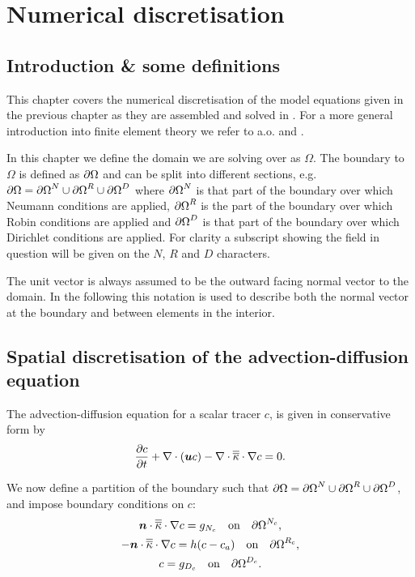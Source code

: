 \chapter{Numerical discretisation}\label{chap:numerical_discretisation}
\section{Introduction \& some definitions}\label{sec:ND_Intro}
This chapter covers the numerical discretisation of the model equations
given in the previous chapter as they are assembled and solved
in \fluidity. For a more general introduction into finite element theory
we refer to a.o. \cite{elman2005} and \cite{gresho1988}.

In this chapter we define the domain we are solving over as $\Omega$. The boundary to
$\Omega$ is defined as ${\partial\Omega}$
and can be split into different sections, e.g.
$\partial\Omega = {\partial\Omega}^{N}\cup {\partial\Omega}^{R}\cup {\partial\Omega}^{D}$
where ${\partial\Omega}^{N}$ is that part of the boundary over
which Neumann conditions are applied, ${\partial\Omega}^{R}$ is the part of the
boundary over which Robin conditions are applied and ${\partial\Omega}^{D}$ is that part of the boundary over
which Dirichlet conditions are applied. For clarity a subscript showing the field in question will
be given on the $N$, $R$ and $D$ characters.

The unit vector  is always assumed to be the
outward facing normal vector to the domain.
In the following this notation is used to describe both the normal vector at the boundary
and between elements in the interior.

\section{Spatial discretisation of the advection-diffusion equation}
\label{sec:ND_advection_diffusion_discretisation}

The advection-diffusion equation for a scalar tracer $c$,
is given in conservative form by
\begin{equation}\label{eq:advdif}
  \frac{\partial c}{\partial t} + \nabla\cdot\left({\mbox{\boldmath$u$}} c\right) - \nabla\cdot\overline{\overline{\kappa}}\cdot\nabla c = 0.
\end{equation}

We now define a partition of the boundary such that
$\partial\Omega = {\partial\Omega}^{N}\cup {\partial\Omega}^{R}\cup {\partial\Omega}^{D}$, and impose boundary conditions on $c$:
\begin{gather}
  \label{eq:cboundary}
  {\mbox{\boldmath$n$}}\cdot\overline{\overline{\kappa}}\cdot\nabla c=g_{N_c} \quad\textrm{on}\quad {\partial\Omega}^{N_c},\\
  -{\mbox{\boldmath$n$}}\cdot\overline{\overline{\kappa}}\cdot\nabla c=h(c-c_{a})\quad\textrm{on}\quad {\partial\Omega}^{R_c},\\
  c=g_{D_c} \quad\textrm{on}\quad {\partial\Omega}^{D_c}.
\end{gather}

